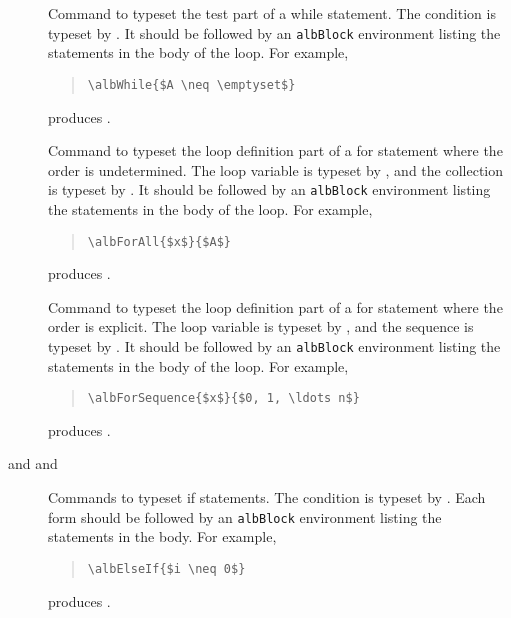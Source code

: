 \documentclass[11pt,a4paper,oneside,titlepage]{alb-latex}
\begin{document}
\begin{description}
\item[] Command to typeset the test
  part of a while statement.  The condition is typeset by
  .  It should be followed by an \texttt{albBlock}
  environment listing the statements in the body of the loop.  For
  example,
  \begin{quote}
\begin{verbatim}
\albWhile{$A \neq \emptyset$}
\end{verbatim}
  \end{quote}
  produces .

\item[] Command to
  typeset the loop definition part of a for statement where the order is
  undetermined.  The loop variable is typeset by , and
  the collection is typeset by .  It should be followed
  by an \texttt{albBlock} environment listing the statements in the body
  of the loop.  For example,
  \begin{quote}
\begin{verbatim}
\albForAll{$x$}{$A$}
\end{verbatim}
  \end{quote}
  produces .

\item[] Command
  to typeset the loop definition part of a for statement where the order
  is explicit.  The loop variable is typeset by , and the
  sequence is typeset by .  It should be followed by an
  \texttt{albBlock} environment listing the statements in the body of
  the loop.  For example,
  \begin{quote}
\begin{verbatim}
\albForSequence{$x$}{$0, 1, \ldots n$}
\end{verbatim}
  \end{quote}
  produces .

\item[%
   and
   and %
  ] Commands to typeset if statements.  The condition is typeset by
  .  Each form should be followed by an
  \texttt{albBlock} environment listing the statements in the body.  For
  example,
  \begin{quote}
\begin{verbatim}
\albElseIf{$i \neq 0$}
\end{verbatim}
  \end{quote}
  produces .
\end{description}
\end{document}

